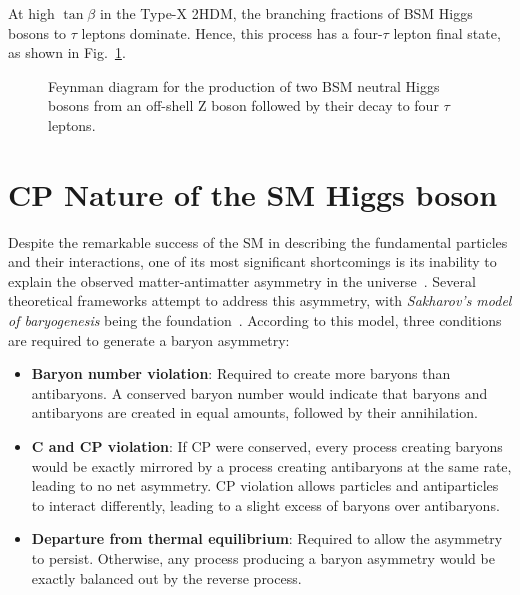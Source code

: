 At high $\tan\beta$ in the Type-X 2HDM, the branching fractions of BSM Higgs bosons to $\tau$ leptons dominate. Hence, this process has a four-$\tau$ lepton final state, as shown in Fig.~\ref{Figure:Chapter2_Feynman4tau}. 

\begin{figure}[h]
\centering

\caption{Feynman diagram for the production of two BSM neutral Higgs bosons from an off-shell Z boson followed by their decay to four $\tau$ leptons.}
\label{Figure:Chapter2_Feynman4tau}
\end{figure}

\section{CP Nature of the SM Higgs boson}

Despite the remarkable success of the SM in describing the fundamental particles and their interactions, one of its most significant shortcomings is its inability to explain the observed matter-antimatter asymmetry in the universe~\cite{MatterAntimatter}. Several theoretical frameworks attempt to address this asymmetry, with \textit{Sakharov's model of baryogenesis} being the foundation~\cite{Sakharov}. According to this model, three conditions are required to generate a baryon asymmetry:

\begin{itemize}
    \item \textbf{Baryon number violation}: Required to create more baryons than antibaryons. A conserved baryon number would indicate that baryons and antibaryons are created in equal amounts, followed by their annihilation.
    \item \textbf{C and CP violation}: If CP were conserved, every process creating baryons would be exactly mirrored by a process creating antibaryons at the same rate, leading to no net asymmetry. CP violation allows particles and antiparticles to interact differently, leading to a slight excess of baryons over antibaryons.
    \item \textbf{Departure from thermal equilibrium}: Required to allow the asymmetry to persist. Otherwise, any process producing a baryon asymmetry would be exactly balanced out by the reverse process.
\end{itemize}

